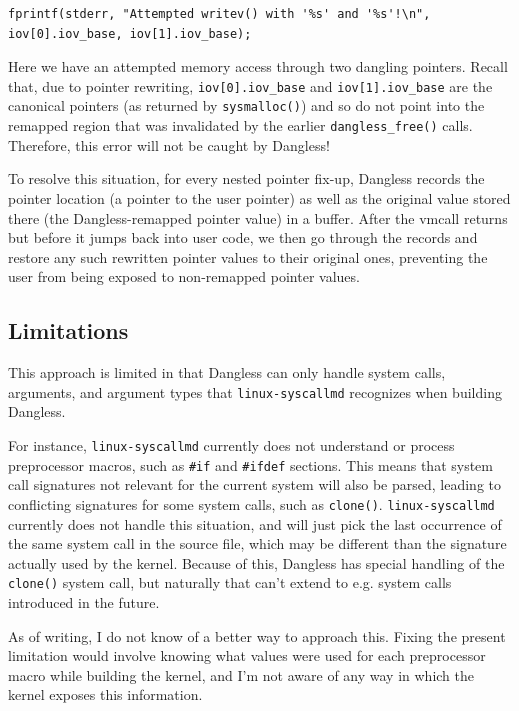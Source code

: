\begin{lstlisting}
fprintf(stderr, "Attempted writev() with '%s' and '%s'!\n", iov[0].iov_base, iov[1].iov_base);
\end{lstlisting}

Here we have an attempted memory access through two dangling pointers. Recall that, due to pointer rewriting, \lstinline|iov[0].iov_base| and \lstinline|iov[1].iov_base| are the canonical pointers (as returned by \lstinline!sysmalloc()!) and so do not point into the remapped region that was invalidated by the earlier \lstinline!dangless_free()! calls. Therefore, this error will not be caught by Dangless!

To resolve this situation, for every nested pointer fix-up, Dangless records the pointer location (a pointer to the user pointer) as well as the original value stored there (the Dangless-remapped pointer value) in a buffer. After the vmcall returns but before it jumps back into user code, we then go through the records and restore any such rewritten pointer values to their original ones, preventing the user from being exposed to non-remapped pointer values.

\subsection{Limitations}

This approach is limited in that Dangless can only handle system calls, arguments, and argument types that \texttt{linux-syscallmd} recognizes when building Dangless.

For instance, \texttt{linux-syscallmd} currently does not understand or process preprocessor macros, such as \lstinline!#if! and \lstinline!#ifdef! sections. This means that system call signatures not relevant for the current system will also be parsed, leading to conflicting signatures for some system calls, such as \lstinline!clone()!. \texttt{linux-syscallmd} currently does not handle this situation, and will just pick the last occurrence of the same system call in the source file, which may be different than the signature actually used by the kernel. Because of this, Dangless has special handling of the \lstinline!clone()! system call, but naturally that can't extend to e.g. system calls introduced in the future.

As of writing, I do not know of a better way to approach this. Fixing the present limitation would involve knowing what values were used for each preprocessor macro while building the kernel, and I'm not aware of any way in which the kernel exposes this information.

